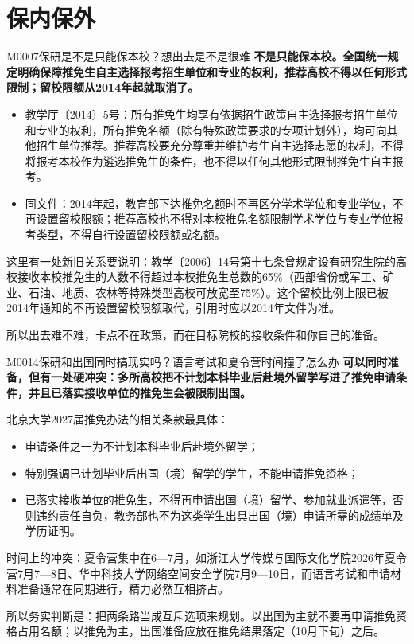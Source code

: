 \section{保内保外}
\begin{qa}{M0007}{保研是不是只能保本校？想出去是不是很难}
\textbf{不是只能保本校。全国统一规定明确保障推免生自主选择报考招生单位和专业的权利，推荐高校不得以任何形式限制；留校限额从2014年起就取消了。}

\begin{itemize}
  \item 教学厅〔2014〕5号：所有推免生均享有依据招生政策自主选择报考招生单位和专业的权利，所有推免名额（除有特殊政策要求的专项计划外），均可向其他招生单位推荐。推荐高校要充分尊重并维护考生自主选择志愿的权利，不得将报考本校作为遴选推免生的条件，也不得以任何其他形式限制推免生自主报考。
  \item 同文件：2014年起，教育部下达推免名额时不再区分学术学位和专业学位，不再设置留校限额；推荐高校也不得对本校推免名额限制学术学位与专业学位报考类型，不得自行设置留校限额或名额。
\end{itemize}

这里有一处新旧关系要说明：教学〔2006〕14号第十七条曾规定设有研究生院的高校接收本校推免生的人数不得超过本校推免生总数的65\%（西部省份或军工、矿业、石油、地质、农林等特殊类型高校可放宽至75\%）。这个留校比例上限已被2014年通知的不再设置留校限额取代，引用时应以2014年文件为准。

所以出去难不难，卡点不在政策，而在目标院校的接收条件和你自己的准备。
\end{qa}

\begin{qa}{M0014}{保研和出国同时搞现实吗？语言考试和夏令营时间撞了怎么办}
\textbf{可以同时准备，但有一处硬冲突：多所高校把不计划本科毕业后赴境外留学写进了推免申请条件，并且已落实接收单位的推免生会被限制出国。}

北京大学2027届推免办法的相关条款最具体：

\begin{itemize}
  \item 申请条件之一为不计划本科毕业后赴境外留学；
  \item 特别强调已计划毕业后出国（境）留学的学生，不能申请推免资格；
  \item 已落实接收单位的推免生，不得再申请出国（境）留学、参加就业派遣等，否则违约责任自负，教务部也不为这类学生出具出国（境）申请所需的成绩单及学历证明。
\end{itemize}

时间上的冲突：夏令营集中在6—7月，如浙江大学传媒与国际文化学院2026年夏令营7月7—8日、华中科技大学网络空间安全学院7月9—10日，而语言考试和申请材料准备通常在同期进行，精力必然互相挤占。

所以务实判断是：把两条路当成互斥选项来规划。以出国为主就不要再申请推免资格占用名额；以推免为主，出国准备应放在推免结果落定（10月下旬）之后。
\end{qa}

